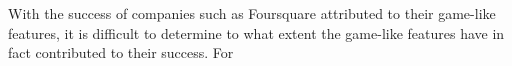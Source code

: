 With the success of companies such as Foursquare attributed to their game-like
features, it is difficult to determine to what extent the game-like features
have in fact contributed to their success. For 
